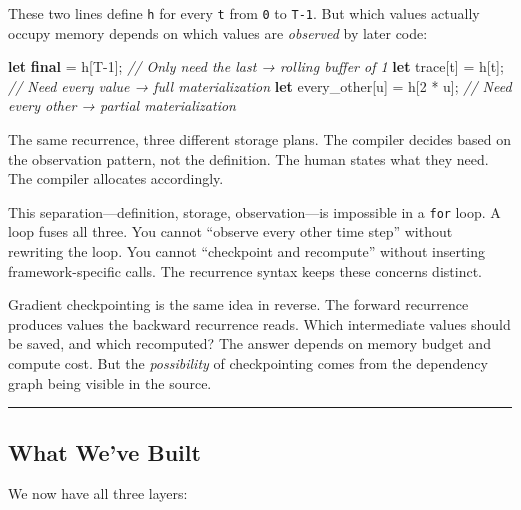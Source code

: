 \documentclass[11pt,]{article}
\newenvironment{Shaded}{}{}
\newcommand{\CommentTok}[1]{\textcolor[rgb]{0.38,0.63,0.69}{\textit{#1}}}
\newcommand{\DecValTok}[1]{\textcolor[rgb]{0.25,0.63,0.44}{#1}}
\newcommand{\KeywordTok}[1]{\textcolor[rgb]{0.00,0.44,0.13}{\textbf{#1}}}
\newcommand{\NormalTok}[1]{#1}
\newcommand{\OperatorTok}[1]{\textcolor[rgb]{0.40,0.40,0.40}{#1}}
\begin{document}
These two lines define \texttt{h} for every \texttt{t} from \texttt{0}
to \texttt{T-1}. But which values actually occupy memory depends on
which values are \emph{observed} by later code:

\begin{Shaded}
\begin{Highlighting}[]
\KeywordTok{let} \KeywordTok{final}\NormalTok{ = h}\OperatorTok{[}\NormalTok{T-}\DecValTok{1}\OperatorTok{]}\NormalTok{;              }\CommentTok{// Only need the last → rolling buffer of 1}
\KeywordTok{let}\NormalTok{ trace}\OperatorTok{[}\NormalTok{t}\OperatorTok{]}\NormalTok{ = h}\OperatorTok{[}\NormalTok{t}\OperatorTok{]}\NormalTok{;             }\CommentTok{// Need every value → full materialization}
\KeywordTok{let}\NormalTok{ every_other}\OperatorTok{[}\NormalTok{u}\OperatorTok{]}\NormalTok{ = h}\OperatorTok{[}\DecValTok{2}\NormalTok{ * u}\OperatorTok{]}\NormalTok{;   }\CommentTok{// Need every other → partial materialization}
\end{Highlighting}
\end{Shaded}

The same recurrence, three different storage plans. The compiler decides
based on the observation pattern, not the definition. The human states
what they need. The compiler allocates accordingly.

This separation---definition, storage, observation---is impossible in a
\texttt{for} loop. A loop fuses all three. You cannot ``observe every
other time step'' without rewriting the loop. You cannot ``checkpoint
and recompute'' without inserting framework-specific calls. The
recurrence syntax keeps these concerns distinct.

Gradient checkpointing is the same idea in reverse. The forward
recurrence produces values the backward recurrence reads. Which
intermediate values should be saved, and which recomputed? The answer
depends on memory budget and compute cost. But the \emph{possibility} of
checkpointing comes from the dependency graph being visible in the
source.

\begin{center}\rule{0.5\linewidth}{0.4pt}\end{center}

\hypertarget{what-weve-built}{%
\subsection{What We've Built}\label{what-weve-built}}

We now have all three layers:
\end{document}
